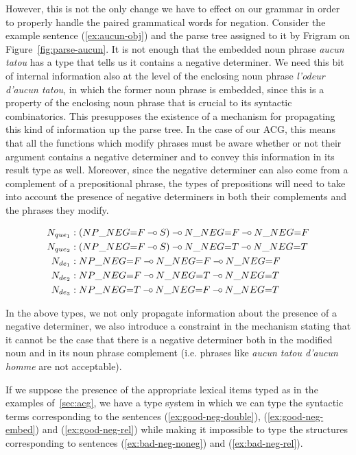 However, this is not the only change we have to effect on our grammar in
order to properly handle the paired grammatical words for
negation. Consider the example sentence (\ref{ex:aucun-obj}) and the
parse tree assigned to it by Frigram on Figure~\ref{fig:parse-aucun}. It
is not enough that the embedded noun phrase \emph{aucun tatou} has a
type that tells us it contains a negative determiner. We need this bit
of internal information also at the level of the enclosing noun phrase
\emph{l'odeur d'aucun tatou}, in which the former noun phrase is
embedded, since this is a property of the enclosing noun phrase that is
crucial to its syntactic combinatorics. This presupposes the existence
of a mechanism for propagating this kind of information up the parse
tree. In the case of our ACG, this means that all the functions which
modify phrases must be aware whether or not their argument contains a
negative determiner and to convey this information in its result type as
well. Moreover, since the negative determiner can also come from a
complement of a prepositional phrase, the types of prepositions will
need to take into account the presence of negative determiners in both
their complements and the phrases they modify.

\begin{align*}
N_{que_1} &: (NP\_NEG{=}F \limp S) \limp N\_NEG{=}F \limp N\_NEG{=}F \\
N_{que_2} &: (NP\_NEG{=}F \limp S) \limp N\_NEG{=}T \limp N\_NEG{=}T \\
N_{de_1} &: NP\_NEG{=}F \limp N\_NEG{=}F \limp N\_NEG{=}F \\
N_{de_2} &: NP\_NEG{=}F \limp N\_NEG{=}T \limp N\_NEG{=}T \\
N_{de_3} &: NP\_NEG{=}T \limp N\_NEG{=}F \limp N\_NEG{=}T
\end{align*}

In the above types, we not only propagate information about the presence
of a negative determiner, we also introduce a constraint in the
mechanism stating that it cannot be the case that there is a negative
determiner both in the modified noun and in its noun phrase complement
(i.e. phrases like \emph{aucun tatou d'aucun homme} are not acceptable).

If we suppose the presence of the appropriate lexical items typed as in
the examples of~\ref{sec:acg}, we have a type system in which we can
type the syntactic terms corresponding to the sentences
(\ref{ex:good-neg-double}), (\ref{ex:good-neg-embed}) and
(\ref{ex:good-neg-rel}) while making it impossible to type the
structures corresponding to sentences (\ref{ex:bad-neg-noneg}) and
({\ref{ex:bad-neg-rel}}).

